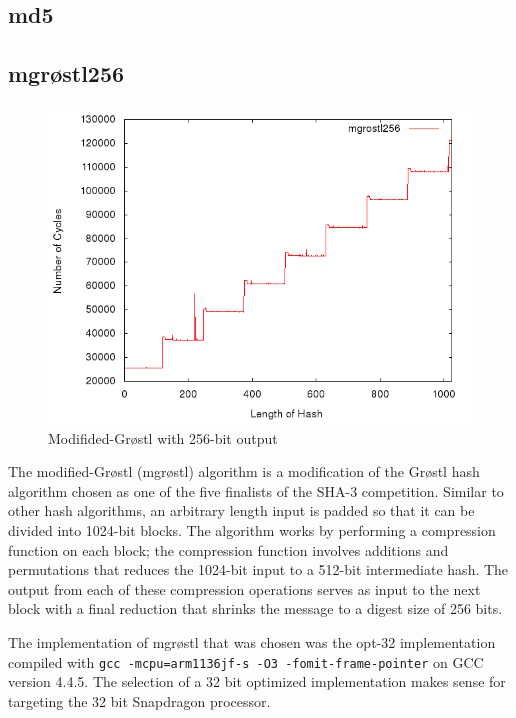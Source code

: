 \documentclass[10pt,a4paper]{article}
\begin{document}
\subsection{md5}


\subsection{mgr{\o}stl256}
\begin{figure}[H]
    \begin{center}
        \includegraphics[scale=0.5]{images/mgrostl256.png} 
        \caption{Modifided-Gr{\o}stl with 256-bit output}
    \end{center}
\end{figure}

The modified-Gr{\o}stl (mgr{\o}stl) algorithm is a modification of the Gr{\o}stl
hash algorithm chosen as one of the five finalists of the SHA-3 competition.
Similar to other hash algorithms, an arbitrary length input is padded so that it
can be divided into 1024-bit blocks.  The algorithm works by performing a
compression function on each block; the compression function involves additions
and permutations that reduces the 1024-bit input to a 512-bit intermediate hash.
The output from each of these compression operations serves as input to the next
block with a final reduction that shrinks the message to a digest size of 256
bits. 

The implementation of mgr{\o}stl that was chosen was the opt-32 implementation
compiled with \texttt{gcc -mcpu=arm1136jf-s -O3 -fomit-frame-pointer} on GCC
version 4.4.5. The selection of a 32 bit optimized implementation makes sense
for targeting the 32 bit Snapdragon processor.
\end{document}

